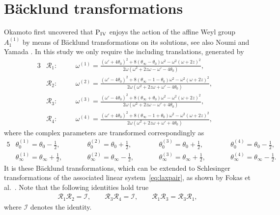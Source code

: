 \documentclass[pdftex]{sigma}
\numberwithin{equation}{section}
\newcommand{\om}{\omega}
\begin{document}
\section{B\"acklund transformations}\label{section:backlund}
Okamoto \cite{okamoto} f\/irst uncovered that ${\rm P}_{\rm IV}$ enjoys the action of the af\/f\/ine Weyl group $A_1^{(1)}$ by means
of B\"acklund transformations on its solutions, see also Noumi and Yamada \cite{noumiyamada}.
In this study we only require the including translations, generated by
\begin{alignat}{3}
&\mathcal{R}_1\colon \quad&& \om^{(1)}= \frac{(\om'+4\theta_0)^2+8(\theta_\infty-\theta_0)\om^2-\om^2(\om+2z)^2}{2\om(\om^2+2z\om-\om'-4\theta_0)},&\nonumber \\
&\mathcal{R}_2\colon \quad &&\om^{(2)}= \frac{(\om'-4\theta_0)^2+8(\theta_\infty-1-\theta_0)\om^2-\om^2(\om+2z)^2}{2\om(\om^2+2z\om+\om'-4\theta_0)},&\nonumber\\
&\mathcal{R}_3\colon \quad & &\om^{(3)}= \frac{(\om'-4\theta_0)^2+8(\theta_\infty+\theta_0)\om^2-\om^2(\om+2z)^2}{2\om(\om^2+2z\om-\om'+4\theta_0)},&\nonumber\\
&\mathcal{R}_4\colon \quad &&\om^{(4)}= \frac{(\om'+4\theta_0)^2+8(\theta_\infty-1+\theta_0)\om^2-\om^2(\om+2z)^2}{2\om(\om^2+2z\om+\om'+4\theta_0)},&\label{eq:backluend1}
\end{alignat}
where the complex parameters are transformed correspondingly as
\begin{alignat*}{5}
& \theta_0^{(1)}=\theta_0-\tfrac{1}{2},\qquad &&\theta_0^{(2)}=\theta_0+\tfrac{1}{2},\qquad &&
\theta_0^{(3)}=\theta_0+\tfrac{1}{2},\qquad &&\theta_0^{(4)}=\theta_0-\tfrac{1}{2},& \\
& \theta_\infty^{(1)}=\theta_\infty+\tfrac{1}{2},\qquad &&\theta_\infty^{(2)}=\theta_\infty-\tfrac{1}{2},\qquad &&\theta_\infty^{(3)}=\theta_\infty+\tfrac{1}{2},\qquad &&\theta_\infty^{(4)}=\theta_\infty-\tfrac{1}{2}.&
\end{alignat*}
It is these B\"acklund transformations, which can be extended to Schlesinger transformations of the associated linear system~\eqref{eq:laxpair}, as shown by Fokas et al.~\cite{fokasmugan1988}. Note that the following identities hold true
\begin{gather*}
\mathcal{R}_1\mathcal{R}_2=\mathcal{I},\qquad \mathcal{R}_3\mathcal{R}_4=\mathcal{I},\qquad \mathcal{R}_1\mathcal{R}_3=\mathcal{R}_3\mathcal{R}_1,
\end{gather*}
where $\mathcal{I}$ denotes the identity.
\end{document}

